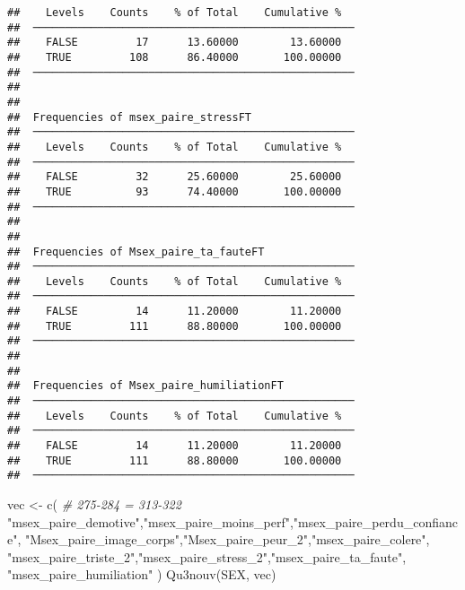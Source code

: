 \documentclass[
]{article}
\newenvironment{Shaded}{\begin{snugshade}}{\end{snugshade}}
\newcommand{\CommentTok}[1]{\textcolor[rgb]{0.56,0.35,0.01}{\textit{#1}}}
\newcommand{\FunctionTok}[1]{\textcolor[rgb]{0.00,0.00,0.00}{#1}}
\newcommand{\NormalTok}[1]{#1}
\newcommand{\OtherTok}[1]{\textcolor[rgb]{0.56,0.35,0.01}{#1}}
\newcommand{\StringTok}[1]{\textcolor[rgb]{0.31,0.60,0.02}{#1}}
\begin{document}
\begin{verbatim}
##    Levels    Counts    % of Total    Cumulative %   
##  ────────────────────────────────────────────────── 
##    FALSE         17      13.60000        13.60000   
##    TRUE         108      86.40000       100.00000   
##  ────────────────────────────────────────────────── 
## 
## 
##  Frequencies of msex_paire_stressFT                 
##  ────────────────────────────────────────────────── 
##    Levels    Counts    % of Total    Cumulative %   
##  ────────────────────────────────────────────────── 
##    FALSE         32      25.60000        25.60000   
##    TRUE          93      74.40000       100.00000   
##  ────────────────────────────────────────────────── 
## 
## 
##  Frequencies of Msex_paire_ta_fauteFT               
##  ────────────────────────────────────────────────── 
##    Levels    Counts    % of Total    Cumulative %   
##  ────────────────────────────────────────────────── 
##    FALSE         14      11.20000        11.20000   
##    TRUE         111      88.80000       100.00000   
##  ────────────────────────────────────────────────── 
## 
## 
##  Frequencies of Msex_paire_humiliationFT            
##  ────────────────────────────────────────────────── 
##    Levels    Counts    % of Total    Cumulative %   
##  ────────────────────────────────────────────────── 
##    FALSE         14      11.20000        11.20000   
##    TRUE         111      88.80000       100.00000   
##  ──────────────────────────────────────────────────
\end{verbatim}

\begin{Shaded}
\begin{Highlighting}[]
\NormalTok{vec }\OtherTok{\textless{}{-}} \FunctionTok{c}\NormalTok{(  }\CommentTok{\# 275{-}284 = 313{-}322}
  \StringTok{"msex\_paire\_demotive"}\NormalTok{,}\StringTok{"msex\_paire\_moins\_perf"}\NormalTok{,}\StringTok{"msex\_paire\_perdu\_confiance"}\NormalTok{,}
  \StringTok{"Msex\_paire\_image\_corps"}\NormalTok{,}\StringTok{"Msex\_paire\_peur\_2"}\NormalTok{,}\StringTok{"msex\_paire\_colere"}\NormalTok{,}
  \StringTok{"msex\_paire\_triste\_2"}\NormalTok{,}\StringTok{"msex\_paire\_stress\_2"}\NormalTok{,}\StringTok{"msex\_paire\_ta\_faute"}\NormalTok{,}
  \StringTok{"msex\_paire\_humiliation"}
\NormalTok{  )}
\FunctionTok{Qu3nouv}\NormalTok{(SEX, vec)}
\end{Highlighting}
\end{Shaded}
\end{document}

